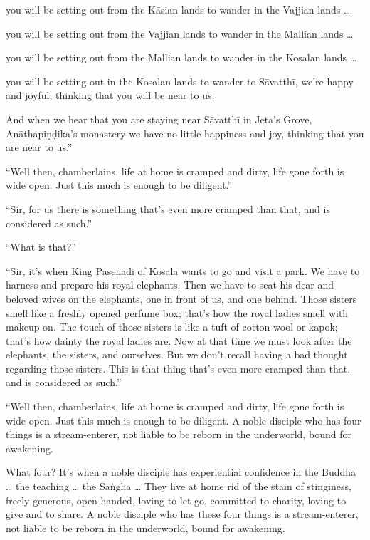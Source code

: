 \documentclass[12pt,openany]{book}%
\begin{document}
you will be setting out from the \textsanskrit{Kāsian} lands to wander in the Vajjian lands … 

you will be setting out from the Vajjian lands to wander in the Mallian lands … 

you will be setting out from the Mallian lands to wander in the Kosalan lands … 

you will be setting out in the Kosalan lands to wander to \textsanskrit{Sāvatthī}, we’re happy and joyful, thinking that you will be near to us. 

And when we hear that you are staying near \textsanskrit{Sāvatthī} in Jeta’s Grove, \textsanskrit{Anāthapiṇḍika}’s monastery we have no little happiness and joy, thinking that you are near to us.” 

“Well then, chamberlains, life at home is cramped and dirty, life gone forth is wide open. Just this much is enough to be diligent.” 

“Sir, for us there is something that’s even more cramped than that, and is considered as such.” 

“What is that?” 

“Sir, it’s when King Pasenadi of Kosala wants to go and visit a park. We have to harness and prepare his royal elephants. Then we have to seat his dear and beloved wives on the elephants, one in front of us, and one behind. Those sisters smell like a freshly opened perfume box; that’s how the royal ladies smell with makeup on. The touch of those sisters is like a tuft of cotton-wool or kapok; that’s how dainty the royal ladies are. Now at that time we must look after the elephants, the sisters, and ourselves. But we don’t recall having a bad thought regarding those sisters. This is that thing that’s even more cramped than that, and is considered as such.” 

“Well then, chamberlains, life at home is cramped and dirty, life gone forth is wide open. Just this much is enough to be diligent. A noble disciple who has four things is a stream-enterer, not liable to be reborn in the underworld, bound for awakening. 

What four? It’s when a noble disciple has experiential confidence in the Buddha … the teaching … the \textsanskrit{Saṅgha} … They live at home rid of the stain of stinginess, freely generous, open-handed, loving to let go, committed to charity, loving to give and to share. A noble disciple who has these four things is a stream-enterer, not liable to be reborn in the underworld, bound for awakening. 
\end{document}
